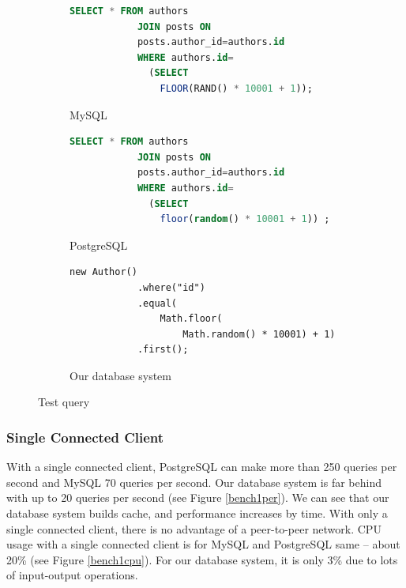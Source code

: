\begin{figure}[h]
    \begin{subfigure}{.3\textwidth}
        \centering
        \begin{lstlisting}[language=SQL,basicstyle=\tiny]
            SELECT * FROM authors 
            JOIN posts ON 
            posts.author_id=authors.id  
            WHERE authors.id=
              (SELECT 
                FLOOR(RAND() * 10001 + 1));
        \end{lstlisting}
        \caption{MySQL}
    \end{subfigure}%
    \begin{subfigure}{.3\textwidth}
        \centering
        \begin{lstlisting}[language=SQL,basicstyle=\tiny]
            SELECT * FROM authors 
            JOIN posts ON 
            posts.author_id=authors.id  
            WHERE authors.id=
              (SELECT 
                floor(random() * 10001 + 1)) ;
        \end{lstlisting}
        \caption{PostgreSQL}
    \end{subfigure}
    \begin{subfigure}{.3\textwidth}
        \centering
        \begin{lstlisting}[style=ES6,basicstyle=\tiny]
            new Author()
            .where("id")
            .equal(
                Math.floor(
                    Math.random() * 10001) + 1)
            .first();
        \end{lstlisting}
        \caption{Our database system}
    \end{subfigure}
    \caption{Test query}
    \label{benchQuery}
\end{figure}


\subsubsection*{Single Connected Client}
With a single connected client, PostgreSQL can make more than 250 queries per second and MySQL 70 queries per second. Our database system is far behind with up to 20 queries per second (see Figure \ref{bench1per}). We can see that our database system builds cache, and performance increases by time. With only a single connected client, there is no advantage of a peer-to-peer network. CPU usage with a single connected client is for MySQL and PostgreSQL same -- about 20\% (see Figure \ref{bench1cpu}). For our database system, it is only 3\% due to lots of input-output operations. 

